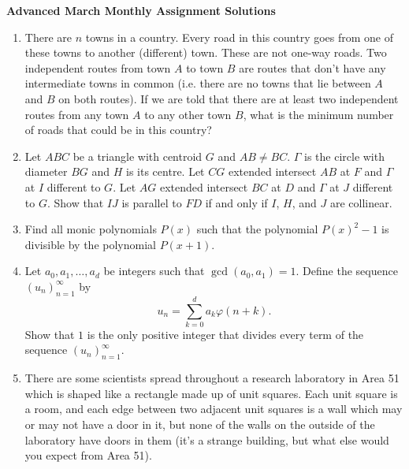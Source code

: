 \documentclass{article}
\begin{document}
\thispagestyle{empty}

\begin{center}
  \textbf{\Large Advanced March Monthly Assignment Solutions}
\end{center}


\begin{enumerate}[1.]
\vfill
\item %
There are $n$ towns in a country.
Every road in this country goes from one of these towns to another (different) town. These are not one-way roads.
Two independent routes from town $A$ to town $B$ are routes that don't have any intermediate towns in common (i.e. there are no towns that lie between $A$ and $B$ on both routes).
If we are told that there are at least two independent routes from any town $A$ to any other town $B$, what is the minimum number of roads that could be in this country?


\vfill
\item %
Let $ABC$ be a triangle with centroid $G$ and $AB\neq BC$.
$\Gamma$ is the circle with diameter $BG$ and $H$ is its centre.
Let $CG$ extended intersect $AB$ at $F$ and $\Gamma$ at $I$ different to $G$.
Let $AG$ extended intersect $BC$ at $D$ and $\Gamma$ at $J$ different to $G$. Show that $IJ$ is parallel to $FD$ if and only if $I$, $H$, and $J$ are collinear.


\vfill
\item %
Find all monic polynomials $P(x)$ such that the polynomial $P(x)^2-1$ is divisible by the polynomial $P(x+1)$.


\vfill
\item %
Let $a_0, a_1, \dots, a_d$ be integers such that $\gcd(a_0, a_1) = 1$. Define the sequence $(u_n)_{n=1}^{\infty}$ by
\[
  u_n = \sum_{k = 0}^{d} a_k \varphi(n + k).
\]
Show that $1$ is the only positive integer that divides every term of the sequence $(u_n)_{n = 1}^{\infty}$.


\vfill
\item %
There are some scientists spread throughout a research laboratory in Area 51 which is shaped like a rectangle made up of unit squares.
Each unit square is a room, and each edge between two adjacent unit squares is a wall which may or may not have a door in it, but none of the walls on the outside of the laboratory have doors in them (it's a strange building, but what else would you expect from Area 51).


\end{enumerate}
\end{document}
